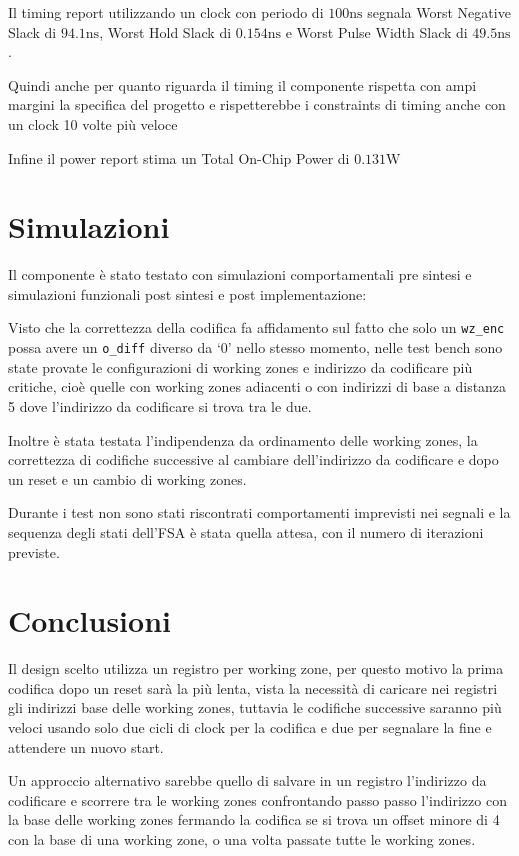 \documentclass[a4paper]{article}
\begin{document}
Il timing report utilizzando un clock con periodo di $100\mathrm{ns}$ segnala Worst Negative Slack di $94.1\mathrm{ns}$, Worst Hold Slack di $0.154\mathrm{ns}$ e Worst Pulse Width Slack di $49.5\mathrm{ns}$.

Quindi anche per quanto riguarda il timing il componente rispetta con ampi margini la specifica del progetto e rispetterebbe i constraints di timing anche con un clock 10 volte più veloce

Infine il power report stima un Total On-Chip Power di $0.131\mathrm{W}$

\section{Simulazioni}

Il componente è stato testato con simulazioni comportamentali pre sintesi e simulazioni funzionali post sintesi e post implementazione:

Visto che la correttezza della codifica fa affidamento sul fatto che solo un \texttt{wz\_enc} possa avere un \texttt{o\_diff} diverso da `0' nello stesso momento, nelle test bench sono state provate le configurazioni di working zones e indirizzo da codificare più critiche, cioè quelle con working zones adiacenti o con indirizzi di base a distanza 5 dove l'indirizzo da codificare si trova tra le due.

Inoltre è stata testata l'indipendenza da ordinamento delle working zones, la correttezza di codifiche successive al cambiare dell'indirizzo da codificare e dopo un reset e un cambio di working zones.

Durante i test non sono stati riscontrati comportamenti imprevisti nei segnali e la sequenza degli stati dell'FSA è stata quella attesa, con il numero di iterazioni previste.

\section{Conclusioni}

Il design scelto utilizza un registro per working zone, per questo motivo la prima codifica dopo un reset sarà la più lenta, vista la necessità di caricare nei registri gli indirizzi base delle working zones, tuttavia le codifiche successive saranno più veloci usando solo due cicli di clock per la codifica e due per segnalare la fine e attendere un nuovo start.

Un approccio alternativo sarebbe quello di salvare in un registro l'indirizzo da codificare e scorrere tra le working zones confrontando passo passo l'indirizzo con la base delle working zones fermando la codifica se si trova un offset minore di 4 con la base di una working zone, o una volta passate tutte le working zones.
\end{document}
